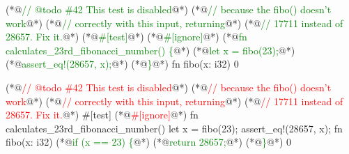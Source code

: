 \documentclass{article}
\begin{document}

\begin{pptWide}{2}
{\scriptsize\begin{ffcode}
(*@\textcolor{green}{// @todo \#42 This test is disabled}@*)
(*@\textcolor{green}{//  because the fibo() doesn't work}@*)
(*@\textcolor{green}{//  correctly with this input, returning}@*)
(*@\textcolor{green}{//  17711 instead of 28657. Fix it.}@*)
(*@\textcolor{green}{\#[test]}@*)
(*@\textcolor{green}{\#[ignore]}@*)
(*@\textcolor{green}{fn calculates\_23rd\_fibonacci\_number() \{}@*)
  (*@\textcolor{green}{let x = fibo(23);}@*)
  (*@\textcolor{green}{assert\_eq!(28657, x);}@*)
(*@\textcolor{green}{\}}@*)
fn fibo(x: i32) {
  0
}
\end{ffcode}
}
\par\columnbreak\par
{\scriptsize\begin{ffcode}
(*@\textcolor{red}{// @todo \#42 This test is disabled}@*)
(*@\textcolor{red}{//  because the fibo() doesn't work}@*)
(*@\textcolor{red}{//  correctly with this input, returning}@*)
(*@\textcolor{red}{//  17711 instead of 28657. Fix it.}@*)
#[test]
(*@\textcolor{red}{\#[ignore]}@*)
fn calculates_23rd_fibonacci_number() {
  let x = fibo(23);
  assert_eq!(28657, x);
}
fn fibo(x: i32) {
  (*@\textcolor{green}{if (x == 23) \{}@*)
    (*@\textcolor{green}{return 28657;}@*)
  (*@\textcolor{green}{\}}@*)
  0
}
\end{ffcode}
}
\end{pptWide}
\plush{}
\end{document}
